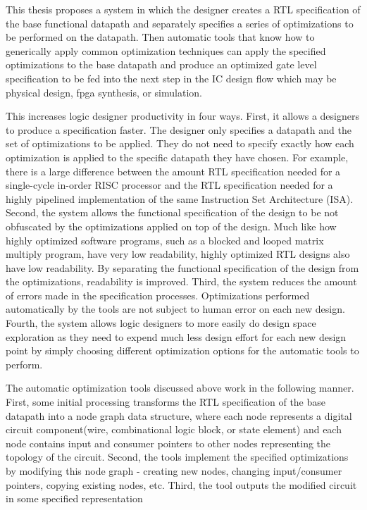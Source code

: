 This thesis proposes a system in which the designer creates a RTL specification of the base functional datapath and separately specifies a series of optimizations to be performed on the datapath. Then automatic tools that know how to generically apply common optimization techniques can apply the specified optimizations to the base datapath and produce an optimized gate level specification to be fed into the next step in the IC design flow which may be physical design, fpga synthesis, or simulation.

This increases logic designer productivity in four ways. First, it allows a designers to produce a specification faster. The designer only specifies a datapath and the set of optimizations to be applied. They do not need to specify exactly how each optimization is applied to the specific datapath they have chosen. For example, there is a large difference between the amount RTL specification needed for a single-cycle in-order RISC processor and the RTL specification needed for a highly pipelined implementation of the same Instruction Set Architecture (ISA). Second, the system allows the functional specification of the design to be not obfuscated by the optimizations applied on top of the design. Much like how highly optimized software programs, such as a blocked and looped matrix multiply program, have very low readability, highly optimized RTL designs also have low readability. By separating the functional specification of the design from the optimizations, readability is improved. Third, the system reduces the amount of errors made in the specification processes. Optimizations performed automatically by the tools are not subject to human error on each new design. Fourth, the system allows logic designers to more easily do design space exploration as they need to expend much less design effort for each new design point by simply choosing different optimization options for the automatic tools to perform.

The automatic optimization tools discussed above work in the following manner. First, some initial processing transforms the RTL specification of the base datapath into a node graph data structure, where each node represents a digital circuit component(wire, combinational logic block, or state element) and each node contains input and consumer pointers to other nodes representing the topology of the circuit. Second, the tools implement the specified optimizations by modifying this node graph - creating new nodes, changing input/consumer pointers, copying existing nodes, etc. Third, the tool outputs the modified circuit in some specified representation
 
